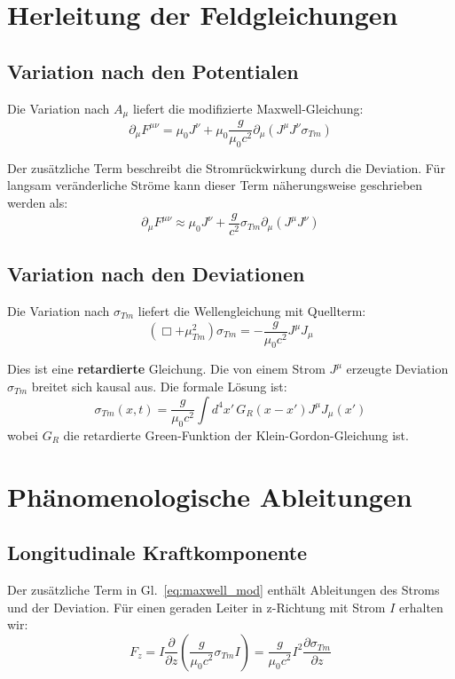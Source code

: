 	\section{Herleitung der Feldgleichungen}
	\subsection{Variation nach den Potentialen}
	Die Variation nach $A_\mu$ liefert die modifizierte Maxwell-Gleichung:
	\begin{equation}
		\partial_\mu F^{\mu\nu} = \mu_0 J^\nu + \mu_0 \frac{g}{\mu_0 c^2} \partial_\mu (J^\mu J^\nu \sigma_{Tm}) \label{eq:maxwell_mod}
	\end{equation}
	
	Der zusätzliche Term beschreibt die Stromrückwirkung durch die Deviation. Für langsam veränderliche Ströme kann dieser Term näherungsweise geschrieben werden als:
	\begin{equation}
		\partial_\mu F^{\mu\nu} \approx \mu_0 J^\nu + \frac{g}{c^2} \sigma_{Tm} \partial_\mu (J^\mu J^\nu) \label{eq:maxwell_approx}
	\end{equation}
	
	\subsection{Variation nach den Deviationen}
	Die Variation nach $\sigma_{Tm}$ liefert die Wellengleichung mit Quellterm:
	\begin{equation}
		(\Box + \mu_{Tm}^2) \sigma_{Tm} = -\frac{g}{\mu_0 c^2} J^\mu J_\mu \label{eq:sigma_eq}
	\end{equation}
	
	Dies ist eine \textbf{retardierte} Gleichung. Die von einem Strom $J^\mu$ erzeugte Deviation $\sigma_{Tm}$ breitet sich kausal aus. Die formale Lösung ist:
	\begin{equation}
		\sigma_{Tm}(x,t) = \frac{g}{\mu_0 c^2} \int d^4x' \, G_R(x-x') J^\mu J_\mu(x') \label{eq:sigma_solution}
	\end{equation}
	wobei $G_R$ die retardierte Green-Funktion der Klein-Gordon-Gleichung ist.
	
	\section{Phänomenologische Ableitungen}
	\subsection{Longitudinale Kraftkomponente}
	Der zusätzliche Term in Gl.~\ref{eq:maxwell_mod} enthält Ableitungen des Stroms und der Deviation. Für einen geraden Leiter in z-Richtung mit Strom $I$ erhalten wir:
	\begin{equation}
		F_z = I \frac{\partial}{\partial z} \left( \frac{g}{\mu_0 c^2} \sigma_{Tm} I \right) = \frac{g}{\mu_0 c^2} I^2 \frac{\partial \sigma_{Tm}}{\partial z} \label{eq:long_force}
	\end{equation}
	
